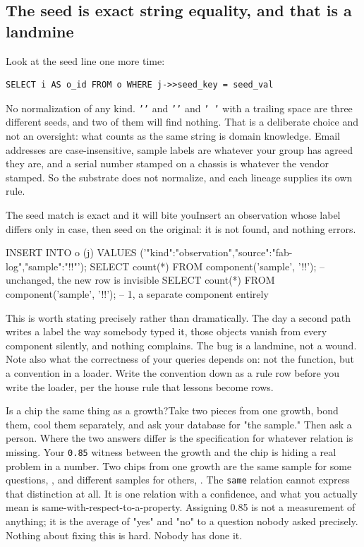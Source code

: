 \subsection{The seed is exact string equality, and that is a landmine}

Look at the seed line one more time:

\begin{lstlisting}
SELECT i AS o_id FROM o WHERE j->>seed_key = seed_val
\end{lstlisting}

No normalization of any kind. \texttt{'\labSample'} and \texttt{'\labSampleLower'} and \texttt{'\labSample{} '} with a trailing space are three different seeds, and two of them will find nothing. That is a deliberate choice and not an oversight: what counts as the same string is domain knowledge. Email addresses are case-insensitive, sample labels are whatever your group has agreed they are, and a serial number stamped on a chassis is whatever the vendor stamped. So the substrate does not normalize, and each lineage supplies its own rule.

\begin{Correspondence}{The seed match is exact and it will bite you}{Insert an observation whose label differs only in case, then seed on the original: it is not found, and nothing errors.}
\begin{Check}
INSERT INTO o (j) VALUES
  ('{"kind":"observation","source":"fab-log","sample":"!\labSampleLower!"}');
SELECT count(*) FROM component('sample', '!\labSample!');   -- unchanged, the new row is invisible
SELECT count(*) FROM component('sample', '!\labSampleLower!');   -- 1, a separate component entirely
\end{Check}
This is worth stating precisely rather than dramatically. The day a second path writes a label the way somebody typed it, those objects vanish from every component silently, and nothing complains. The bug is a landmine, not a wound. Note also what the correctness of your queries depends on: not the function, but a convention in a loader. Write the convention down as a rule row before you write the loader, per the house rule that lessons become rows.
\end{Correspondence}

\begin{Open}{Is a chip the same thing as a growth?}{Take two pieces from one growth, bond them, cool them separately, and ask your database for "the sample." Then ask a person. Where the two answers differ is the specification for whatever relation is missing.}
Your \texttt{0.85} witness between the growth and the chip is hiding a real problem in a number. Two chips from one growth are the same sample for some questions, \labPropertyShared, and different samples for others, \labPropertyDistinct. The \texttt{same} relation cannot express that distinction at all. It is one relation with a confidence, and what you actually mean is same-with-respect-to-a-property. Assigning 0.85 is not a measurement of anything; it is the average of "yes" and "no" to a question nobody asked precisely. Nothing about fixing this is hard. Nobody has done it.
\end{Open}

